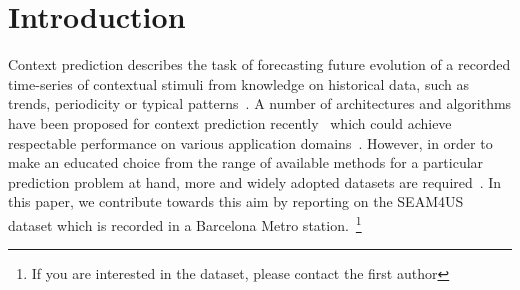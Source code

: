 \section{Introduction}
\label{sec:introduction}
Context prediction describes the task of forecasting future evolution of a recorded time-series of contextual stimuli from knowledge on historical data, such as trends, periodicity or typical patterns~\cite{4011,5001}.
A number of architectures and algorithms have been proposed for context prediction recently~\cite{4027,2097,Prediction_Eldaw_2013} which could achieve respectable performance on various application domains~\cite{4026,Prediction_Zhang_2013}.
However, in order to make an educated choice from the range of available methods for a particular prediction problem at hand, more and widely adopted datasets are required~\cite{Prediction_Zhang_2012}.
In this paper, we contribute towards this aim by reporting on the SEAM4US dataset which is recorded in a Barcelona Metro station.~\footnote{If you are interested in the dataset, please contact the first author}

